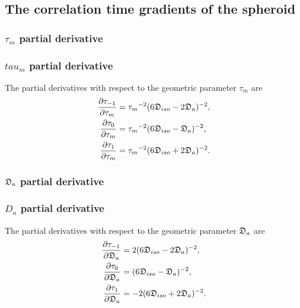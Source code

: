 
\subsection{The correlation time gradients of the spheroid}


\begin{latexonly}
    \subsubsection{$\tau_m$ partial derivative}
\end{latexonly}
\begin{htmlonly}
    \subsubsection{$tau_m$ partial derivative}
\end{htmlonly}

The partial derivatives with respect to the geometric parameter $\tau_m$ are
\begin{subequations}
\begin{align}
    \frac{\partial \tau_{-1}}{\partial \tau_m} &= {\tau_m}^{-2} (6\mathfrak{D}_{iso} - 2\mathfrak{D}_a)^{-2}, \\
    \frac{\partial \tau_{0}}{\partial \tau_m}  &= {\tau_m}^{-2} (6\mathfrak{D}_{iso} - \mathfrak{D}_a)^{-2}, \\
    \frac{\partial \tau_{1}}{\partial \tau_m}  &= {\tau_m}^{-2} (6\mathfrak{D}_{iso} + 2\mathfrak{D}_a)^{-2}.
\end{align}
\end{subequations}



\begin{latexonly}
    \subsubsection{$\mathfrak{D}_a$ partial derivative}
\end{latexonly}
\begin{htmlonly}
    \subsubsection{$D_a$ partial derivative}
\end{htmlonly}

The partial derivatives with respect to the geometric parameter $\mathfrak{D}_a$ are
\begin{subequations}
\begin{align}
    \frac{\partial \tau_{-1}}{\partial \mathfrak{D}_a} &= 2(6\mathfrak{D}_{iso} - 2\mathfrak{D}_a)^{-2}, \\
    \frac{\partial \tau_{0}}{\partial \mathfrak{D}_a}  &= (6\mathfrak{D}_{iso} - \mathfrak{D}_a)^{-2}, \\
    \frac{\partial \tau_{1}}{\partial \mathfrak{D}_a}  &= -2(6\mathfrak{D}_{iso} + 2\mathfrak{D}_a)^{-2}.
\end{align}
\end{subequations}



